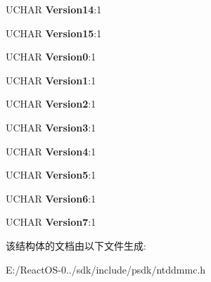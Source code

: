\begin{DoxyCompactItemize}
\mbox{\label{struct___b_d___c_l_a_s_s___s_u_p_p_o_r_t___b_i_t_m_a_p_a33430b343d87dd6f69af266fb6cb0e81}} 
U\+C\+H\+AR {\bfseries Version14}\+:1
\item 
\mbox{\label{struct___b_d___c_l_a_s_s___s_u_p_p_o_r_t___b_i_t_m_a_p_ae041d57b8d3704a569eceb08240e986d}} 
U\+C\+H\+AR {\bfseries Version15}\+:1
\item 
\mbox{\label{struct___b_d___c_l_a_s_s___s_u_p_p_o_r_t___b_i_t_m_a_p_a682ec98d8f26ba542f3789b7ca4e5642}} 
U\+C\+H\+AR {\bfseries Version0}\+:1
\item 
\mbox{\label{struct___b_d___c_l_a_s_s___s_u_p_p_o_r_t___b_i_t_m_a_p_a774551bf732efeb51d9aacb54ea77aeb}} 
U\+C\+H\+AR {\bfseries Version1}\+:1
\item 
\mbox{\label{struct___b_d___c_l_a_s_s___s_u_p_p_o_r_t___b_i_t_m_a_p_acca284447d18e9200a9fbdaceafdbd9a}} 
U\+C\+H\+AR {\bfseries Version2}\+:1
\item 
\mbox{\label{struct___b_d___c_l_a_s_s___s_u_p_p_o_r_t___b_i_t_m_a_p_a6b44f4923ff93c3ec76df72ddd52c050}} 
U\+C\+H\+AR {\bfseries Version3}\+:1
\item 
\mbox{\label{struct___b_d___c_l_a_s_s___s_u_p_p_o_r_t___b_i_t_m_a_p_a22f1d20de29ef544d59d9cf70033d175}} 
U\+C\+H\+AR {\bfseries Version4}\+:1
\item 
\mbox{\label{struct___b_d___c_l_a_s_s___s_u_p_p_o_r_t___b_i_t_m_a_p_a289133c3929115d3b792710958768697}} 
U\+C\+H\+AR {\bfseries Version5}\+:1
\item 
\mbox{\label{struct___b_d___c_l_a_s_s___s_u_p_p_o_r_t___b_i_t_m_a_p_a98cdaef3627e0c445a0263213e9ee1c9}} 
U\+C\+H\+AR {\bfseries Version6}\+:1
\item 
\mbox{\label{struct___b_d___c_l_a_s_s___s_u_p_p_o_r_t___b_i_t_m_a_p_a3ef3ed20ed8ec71cd80d56cbef7e2f28}} 
U\+C\+H\+AR {\bfseries Version7}\+:1
\end{DoxyCompactItemize}


该结构体的文档由以下文件生成\+:\begin{DoxyCompactItemize}
\item 
E\+:/\+React\+O\+S-\/0../sdk/include/psdk/ntddmmc.\+h\end{DoxyCompactItemize}
